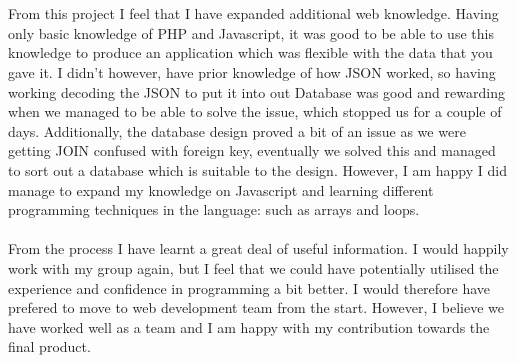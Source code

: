 \documentclass[12pt]{article}
\begin{document}
~\\\\
From this project I feel that I have expanded additional web knowledge. Having only basic knowledge of PHP and Javascript, it was good to be able to use this knowledge to produce an application which was flexible with the data that you gave it. I didn't however, have prior knowledge of how JSON worked, so having working decoding the JSON to put it into out Database was good and rewarding when we managed to be able to solve the issue, which stopped us for a couple of days. Additionally, the database design proved a bit of an issue as we were getting JOIN confused with foreign key, eventually we solved this and managed to sort out a database which is suitable to the design. However, I am happy I did manage to expand my knowledge on Javascript and learning different programming techniques in the language: such as arrays and loops.
~\\\\
From the process I have learnt a great deal of useful information. I would happily work with my group again, but I feel that we could have potentially utilised the experience and confidence in programming a bit better. I would therefore have prefered to move to web development team from the start. However, I believe we have worked well as a team and I am happy with my contribution towards the final product.
\end{document}
